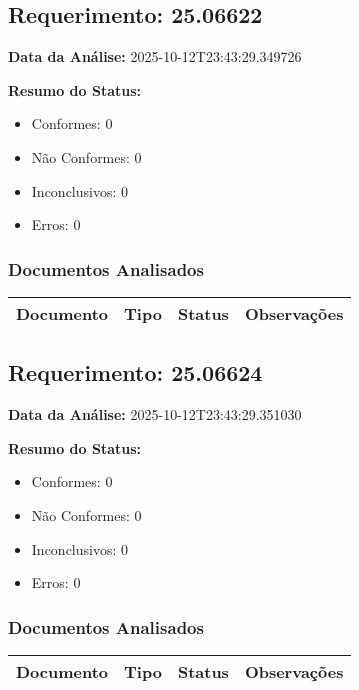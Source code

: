 \documentclass[12pt,a4paper]{article}
\begin{document}
\subsection{Requerimento: 25.06622}

\textbf{Data da Análise:} 2025-10-12T23:43:29.349726

\textbf{Resumo do Status:}
\begin{itemize}
    \item Conformes: 0
    \item Não Conformes: 0
    \item Inconclusivos: 0
    \item Erros: 0
\end{itemize}

\subsubsection{Documentos Analisados}

\begin{longtable}{|p{4cm}|p{2cm}|p{2cm}|p{6cm}|}
\hline
\textbf{Documento} & \textbf{Tipo} & \textbf{Status} & \textbf{Observações} \\
\hline
\endhead
\end{longtable}


\subsection{Requerimento: 25.06624}

\textbf{Data da Análise:} 2025-10-12T23:43:29.351030

\textbf{Resumo do Status:}
\begin{itemize}
    \item Conformes: 0
    \item Não Conformes: 0
    \item Inconclusivos: 0
    \item Erros: 0
\end{itemize}

\subsubsection{Documentos Analisados}

\begin{longtable}{|p{4cm}|p{2cm}|p{2cm}|p{6cm}|}
\hline
\textbf{Documento} & \textbf{Tipo} & \textbf{Status} & \textbf{Observações} \\
\hline
\endhead
\end{longtable}
\end{document}
